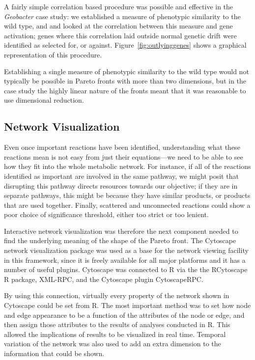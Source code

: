 \documentclass[a4paper,11pt]{article}
\begin{document}
A fairly simple correlation based procedure was possible and effective in the {\it Geobacter} case study: we established a measure of phenotypic similarity to the wild type, and and looked at the correlation between this measure and gene activation; genes where this correlation laid outside normal genetic drift were identified as selected for, or against. Figure~\ref{fig:outlyinggenes} shows a graphical representation of this procedure. 

Establishing a single measure of phenotypic similarity to the wild type would not typically be possible in Pareto fronts with more than two dimensions, but in the case study the highly linear nature of the fronts meant that it was reasonable to use dimensional reduction.

\subsection{Network Visualization}
Even once important reactions have been identified, understanding what these reactions mean is not easy from just their equations---we need to be able to see how they fit into the whole metabolic network. For instance, if all of the reactions identified as important are involved in the same pathway, we might posit that disrupting this pathway directs resources towards our objective; if they are in separate pathways, this might be because they have similar products, or products that are used together. Finally, scattered and unconnected reactions could show a poor choice of significance threshold, either too strict or too lenient.

Interactive network visualization was therefore the next component needed to find the underlying meaning of the shape of the Pareto front. 
The Cytoscape network visualization package was used as a base for the network viewing facility in this framework, since it is freely available for all major platforms and it has a number of useful plugins. Cytoscape was connected to R via the the RCytoscape R package, XML-RPC, and the Cytoscape plugin CytoscapeRPC.

By using this connection, virtually every property of the network shown in Cytoscape could be set from R. The most important method was to set how node and edge appearance to be a function of the attributes of the node or edge, and then assign those attributes to the results of analyses conducted in R. This allowed the implications of results to be visualized in real time. Temporal variation of the network was also used to add an extra dimension to the information that could be shown.
\end{document}
